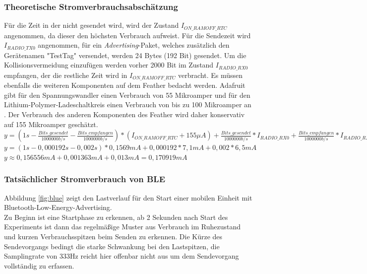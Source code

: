 \subsubsection{Theoretische Stromverbrauchsabschätzung}
Für die Zeit in der nicht gesendet wird, wird der Zustand $I_{ON\_RAMOFF\_RTC}$ angenommen, da dieser den höchsten Verbrauch aufweist.
Für die Sendezeit wird $I_{RADIO\_TX0}$ angenommen, für ein \emph{Advertising}-Paket, welches zusätzlich den Gerätenamen "{}TestTag"{} versendet, werden 24 Bytes (192 Bit) gesendet.
Um die Kollisionsvermeidung einzufügen werden vorher 2000 Bit im Zustand $I_{RADIO\_RX0}$ empfangen, der die restliche Zeit wird in $I_{ON\_RAMOFF\_RTC}$ verbracht. 
Es müssen ebenfalls die weiteren Komponenten auf dem Feather bedacht werden. 
Adafruit gibt für den Spannungswandler einen Verbrauch von 55 Mikroamper und für den Lithium-Polymer-Ladeschaltkreis einen Verbrauch von bis zu 100 Mikroamper an \cite{fried2016lora}. 
Der Verbrauch des anderen Komponenten des Feather wird daher konservativ auf 155 Mikroamper geschätzt.\\[1cm]

$y = (1s-\frac{Bits\_gesendet}{1000000 b/s} - \frac{Bits\_empfangen}{1000000 b/s}) * (I_{ON\_RAMOFF\_RTC} + 155 {\mu}A) + \frac{Bits\_gesendet}{1000000 b/s} * I_{RADIO\_RX0} + \frac{Bits\_empfangen}{1000000 b/s} * I_{RADIO\_RX0}$\\[0.5cm]
$y = (1s - 0,000192s - 0,002s) * 0,1569mA + 0,000192 * 7,1mA + 0,002 * 6,5mA$\\[0.5cm]
$y \approx 0,156556mA + 0,001363mA + 0,013mA = 0,170919mA$ \\[1cm]

\subsubsection{Tatsächlicher Stromverbrauch von BLE}
\label{ch:phase3:sec:powerble}
Abbildung \ref{fig:blue} zeigt den Lastverlauf für den Start einer mobilen Einheit mit Bluetooth-Low-Energy-Advertising.\\
Zu Beginn ist eine Startphase zu erkennen, ab 2 Sekunden nach Start des Experiments ist dann das regelmäßige Muster aus Verbrauch im Ruhezustand und kurzen Verbrauchsspitzen beim Senden zu erkennen.
Die Kürze des Sendevorgangs bedingt die starke Schwankung bei den Lastspitzen, die Samplingrate von 333Hz reicht hier offenbar nicht aus um dem Sendevorgang vollständig zu erfassen.\\

